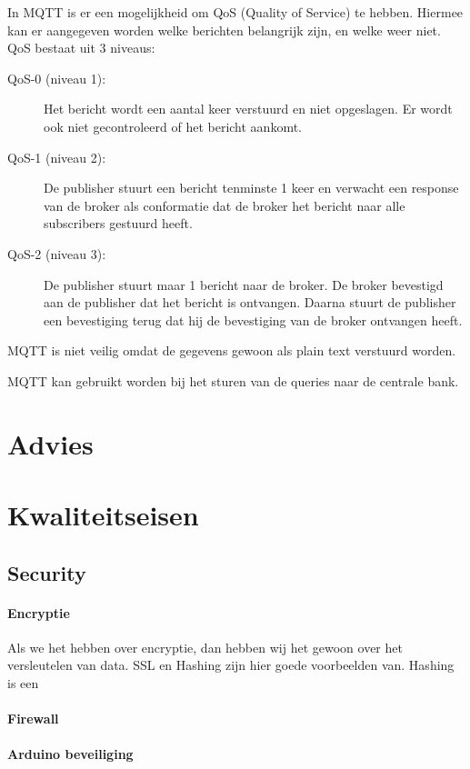 \documentclass{article}
\begin{document}
In MQTT is er een mogelijkheid om QoS (Quality of Service) te hebben.
Hiermee kan er aangegeven worden welke berichten belangrijk zijn,
en welke weer niet.
QoS bestaat uit 3 niveaus:
\begin{description}
	\item [QoS-0 (niveau 1):] Het bericht wordt een aantal keer verstuurd en niet opgeslagen.
		Er wordt ook niet gecontroleerd of het bericht aankomt.
	\item [QoS-1 (niveau 2):] De publisher stuurt een bericht tenminste 1 keer en verwacht
		een response van de broker als conformatie dat de broker het bericht naar alle
		subscribers gestuurd heeft.
	\item [QoS-2 (niveau 3):] De publisher stuurt maar 1 bericht naar de broker. De broker
		bevestigd aan de publisher dat het bericht is ontvangen.
		Daarna stuurt de publisher een bevestiging terug dat hij de bevestiging van de broker
		ontvangen heeft. 
\end{description}
MQTT is niet veilig omdat de gegevens gewoon als plain text verstuurd worden.

MQTT kan gebruikt worden bij het sturen van de queries naar de centrale bank.

\section{Advies}


\section{Kwaliteitseisen}


\subsection{Security}

\paragraph{Encryptie}
Als we het hebben over encryptie,
dan hebben wij het gewoon over het versleutelen van data.
SSL en Hashing zijn hier goede voorbeelden van.
Hashing is een 

\paragraph{Firewall}
\paragraph{Arduino beveiliging}
\end{document}
